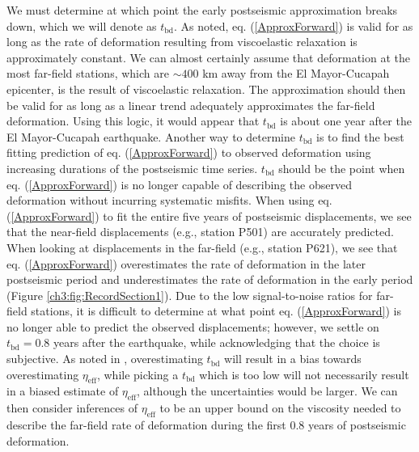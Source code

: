 We must determine at which point the early postseismic approximation
breaks down, which we will denote as $t_{\mathrm{bd}}$.  As noted, eq.
(\ref{ApproxForward}) is valid for as long as the rate of deformation
resulting from viscoelastic relaxation is approximately constant. We
can almost certainly assume that deformation at the most far-field
stations, which are ${\sim}400$ km away from the El Mayor-Cucapah
epicenter, is the result of viscoelastic relaxation. The approximation
should then be valid for as long as a linear trend adequately
approximates the far-field deformation. Using this logic, it would
appear that $t_{\mathrm{bd}}$ is about one year after the El
Mayor-Cucapah earthquake.  Another way to determine $t_{\mathrm{bd}}$
is to find the best fitting prediction of eq. (\ref{ApproxForward}) to
observed deformation using increasing durations of the postseismic
time series.  $t_\mathrm{bd}$ should be the point when eq.
(\ref{ApproxForward}) is no longer capable of describing the observed
deformation without incurring systematic misfits.  When using eq.
(\ref{ApproxForward}) to fit the entire five years of postseismic
displacements, we see that the near-field displacements (e.g., station
P501) are accurately predicted. When looking at displacements in the
far-field (e.g., station P621), we see that eq. (\ref{ApproxForward})
overestimates the rate of deformation in the later postseismic period
and underestimates the rate of deformation in the early period (Figure
\ref{ch3:fig:RecordSection1}).  Due to the low signal-to-noise ratios
for far-field stations, it is difficult to determine at what point eq.
(\ref{ApproxForward}) is no longer able to predict the observed
displacements; however, we settle on $t_{\mathrm{bd}}=0.8$ years after
the earthquake, while acknowledging that the choice is subjective. As
noted in \citet{Hines2016}, overestimating $t_{\mathrm{bd}}$ will
result in a bias towards overestimating $\eta_{\mathrm{eff}}$, while
picking a $t_\mathrm{bd}$ which is too low will not necessarily result
in a biased estimate of $\eta_\mathrm{eff}$, although the
uncertainties would be larger. We can then consider inferences of
$\eta_{\mathrm{eff}}$ to be an upper bound on the viscosity needed to
describe the far-field rate of deformation during the first 0.8 years
of postseismic deformation.

